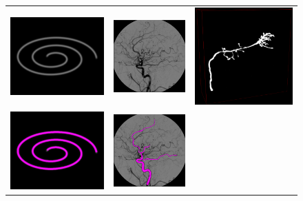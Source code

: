 \documentclass{InsightArticle}
\begin{document}
\begin{figure}[t]
  \centering
  \begin{tabular}{ccc}
    \includegraphics[height=0.31\columnwidth, width=0.31\columnwidth]{Synthetic-02.png} &
    \includegraphics[width=0.31\columnwidth]{Real-DSA-01.png} &
    \includegraphics[width=0.31\columnwidth]{OP_1_3D.png} \\
    \includegraphics[height=0.31\columnwidth, width=0.31\columnwidth]{Synthetic-02_reconst.png} &
    \includegraphics[width=0.31\columnwidth]{Real-DSA-01_reconst.png} &

\end{tabular}
\end{figure}
\end{document}
